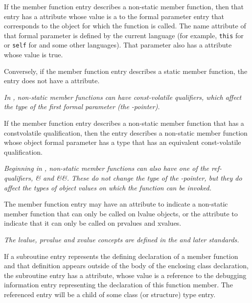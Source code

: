 {
If\hypertarget{chap:DWATobjectpointerobjectthisselfpointerofmemberfunction}{}
the member function entry describes a non-static member
function, then that entry 
has 
a \DWATobjectpointerDEFN{} attribute
whose value is a  
to the formal parameter entry
that corresponds to the object for which the function is
called. The name attribute of that formal parameter is defined
by the current language (for example, 
\texttt{this} for  or \texttt{self}
for  
and some other languages). That parameter
also has a \DWATartificial{} attribute whose value is true.

Conversely, if the member function entry describes a static
member function, the entry does not have a
\DWATobjectpointer{} attribute.

\textit{In , non-static member functions can have const-volatile
qualifiers, which affect the type of the first formal parameter (the
-pointer).}
 
If the member function entry describes a non-static member
function that has a const\dash volatile qualification, then
the entry describes a non-static member function whose
object formal parameter has a type that has an equivalent
const-volatile qualification.

\textit{Beginning in , non-static member 
functions can also have one of the ref-qualifiers, \& and \&\&. 
These do not change the type of the
-pointer, but they do affect the types of 
object values on which the function can be invoked.}

The member function entry may have an \DWATreferenceDEFN{} attribute
to indicate a non-static member function that can only be called on
lvalue objects, or the \DWATrvaluereferenceDEFN{} attribute 
to indicate that it can only be called on prvalues and xvalues.

\textit{The lvalue, prvalue and xvalue concepts are defined in the
 and later standards.}

If a subroutine entry represents the defining declaration
of a member function and that definition appears outside of
the body of the enclosing class declaration, the subroutine
entry has a 
\DWATspecification{} attribute, 
whose value is
a reference to the debugging information entry representing
the declaration of this function member. The referenced entry
will be a child of some class (or structure) type entry.

}
